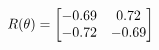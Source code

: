 \documentclass[preview]{standalone}
\begin{document}
\begin{align*}
\special{dvisvgm:raw <g id='unique000'>}R(\theta) = \begin{bmatrix}-0.69 & 0.72\\-0.72 & -0.69\end{bmatrix}\special{dvisvgm:raw </g>}
\end{align*}
\end{document}
